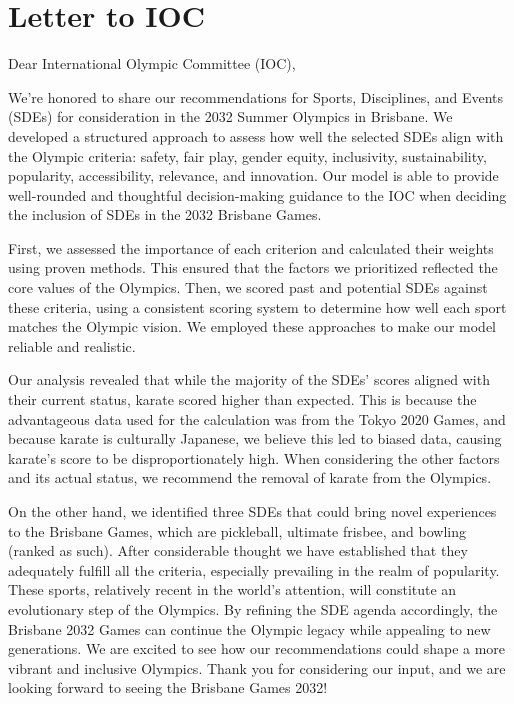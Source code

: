 \documentclass[12pt]{article}
\begin{document}
\section{Letter to IOC}
Dear International Olympic Committee (IOC),

        We’re honored to share our recommendations for Sports, Disciplines, and Events (SDEs) for consideration in the 2032 Summer Olympics in Brisbane. We developed a structured approach to assess how well the selected SDEs align with the Olympic criteria: safety, fair play, gender equity, inclusivity, sustainability, popularity, accessibility, relevance, and innovation. Our model is able to provide well-rounded and thoughtful decision-making guidance to the IOC when deciding the inclusion of SDEs in the 2032 Brisbane Games.
        
        First, we assessed the importance of each criterion and calculated their weights using proven methods. This ensured that the factors we prioritized reflected the core values of the Olympics. Then, we scored past and potential SDEs against these criteria, using a consistent scoring system to determine how well each sport matches the Olympic vision. We employed these approaches to make our model reliable and realistic.
        
        Our analysis revealed that while the majority of the SDEs' scores aligned with their current status, karate scored higher than expected. This is because the advantageous data used for the calculation was from the Tokyo 2020 Games, and because karate is culturally Japanese, we believe this led to biased data, causing karate's score to be disproportionately high. When considering the other factors and its actual status, we recommend the removal of karate from the Olympics.
        
        On the other hand, we identified three SDEs that could bring novel experiences to the Brisbane Games, which are pickleball, ultimate frisbee, and bowling (ranked as such). After considerable thought we have established that they adequately fulfill all the criteria, especially prevailing in the realm of popularity. These sports, relatively recent in the world's attention, will constitute an evolutionary step of the Olympics.
        By refining the SDE agenda accordingly, the Brisbane 2032 Games can continue the Olympic legacy while appealing to new generations.
        We are excited to see how our recommendations could shape a more vibrant and inclusive Olympics. Thank you for considering our input, and we are looking forward to seeing the Brisbane Games 2032!
        
\end{document}
